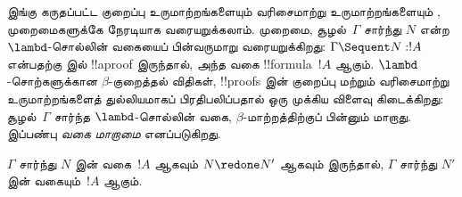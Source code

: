 \documentclass[../../../include/open-logic-section]{subfiles}
\begin{document}


இங்கு கருதப்பட்ட குறைப்பு உருமாற்றங்களையும் வரிசைமாற்று
உருமாற்றங்களையும் ,  முறைமைகளுக்கே
நேரடியாக வரையறுக்கலாம்.  முறைமை, சூழல்~$\Gamma$
சார்ந்து $N$ என்ற $\lambd$-சொல்லின் வகையைப் பின்வருமாறு
வரையறுக்கிறது: $\Gamma \Sequent N : !A$ என்பதற்கு
 இல் !!a{proof} இருந்தால், அந்த வகை
!!{formula}~$!A$ ஆகும். $\lambd$-சொற்களுக்கான
$\beta$-குறைத்தல் விதிகள், !!{proof}s இன் குறைப்பு மற்றும்
வரிசைமாற்று உருமாற்றங்களைத் துல்லியமாகப் பிரதிபலிப்பதால்
ஒரு முக்கிய விளைவு கிடைக்கிறது: சூழல்~$\Gamma$
சார்ந்த $\lambd$-சொல்லின் வகை, $\beta$-மாற்றத்திற்குப்
பின்னும் மாறாது. இப்பண்பு \emph{வகை மாறாமை} எனப்படுகிறது.

\begin{prop}
$\Gamma$ சார்ந்து $N$ இன் வகை~$!A$ ஆகவும்
$N \redone N'$ ஆகவும் இருந்தால், $\Gamma$ சார்ந்து
$N'$ இன் வகையும்~$!A$ ஆகும்.
\end{prop}
\end{document}

